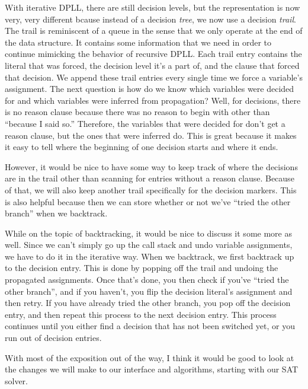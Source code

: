 \documentclass[../main.tex]{subfiles}
\begin{document}
With iterative DPLL, there are still decision levels, but the representation is 
now very, very different bcause instead of a decision \textit{tree}, we now use a 
decision \textit{trail}. The trail is reminiscent of a queue in the sense that 
we only operate at the end of the data structure. It contains some information 
that we need in order to continue mimicking the behavior of recursive DPLL. Each 
trail entry contains the literal that was forced, the decision level it's a part of,
and the clause that forced that decision. We append these trail entries every single 
time we force a variable's assignment. The next question is how do we know which 
variables were decided for and which variables were inferred from propagation?
Well, for decisions, there is no reason clause because there was no reason to 
begin with other than ``because I said so.'' Therefore, the variables that were 
decided for don't get a reason clause, but the ones that were inferred do. This 
is great because it makes it easy to tell where the beginning of one decision 
starts and where it ends.

However, it would be nice to have some way to keep track of where the decisions
are in the trail other than scanning for entries without a reason clause. Because 
of that, we will also keep another trail specifically for the decision markers.
This is also helpful because then we can store whether or not we've ``tried the 
other branch'' when we backtrack. 

While on the topic of backtracking, it would be nice to discuss it some more as well. 
Since we can't simply go up the call stack and undo variable assignments, we have to 
do it in the iterative way. When we backtrack, we first backtrack up to the decision
entry. This is done by popping off the trail and undoing the propagated assignments. 
Once that's done, you then check if you've ``tried the other branch'', and if you 
haven't, you flip the decision literal's assignment and then retry. If you have 
already tried the other branch, you pop off the decision entry, and then repeat 
this process to the next decision entry. This process continues until you either 
find a decision that has not been switched yet, or you run out of decision 
entries.

With most of the exposition out of the way, I think it would be good to 
look at the changes we will make to our interface and algorithms, starting 
with our SAT solver.
\end{document}
